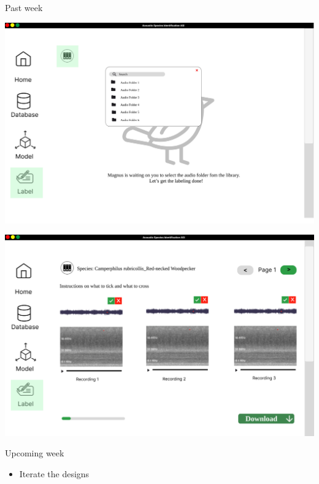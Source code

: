 \begin{frame}{Past week} 
    \begin{minipage}[b]{0.45\textwidth}
        \centering
        \includegraphics[width=\textwidth]{images/sampleui4.png}  
    \end{minipage}%
    \hspace{0.05\textwidth}
    \begin{minipage}[b]{0.45\textwidth}
        \centering
        \includegraphics[width=\textwidth]{images/sampleui3.png}  
    \end{minipage}
\end{frame}

\begin{frame}{Upcoming week} 
    \begin{itemize}
        \item Iterate the designs 
    \end{itemize}  
\end{frame}